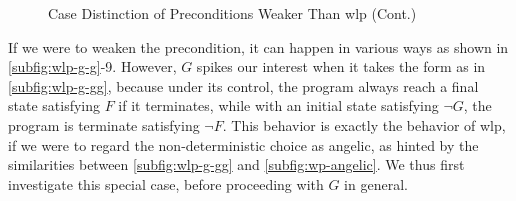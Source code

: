\begin{figure}[ht!]\centering
	\ContinuedFloat
	\hfill

	\hfill
\caption{Case Distinction of Preconditions Weaker Than wlp (Cont.) }
\label{fig:wlp-g-2}
\end{figure}
If we were to weaken the precondition, it can happen in various ways as shown in \autoref{subfig:wlp-g-g}{\color{RoyalBlue}-9}. 
However, $G$ spikes our interest when it takes the form as in \autoref{subfig:wlp-g-gg}, because under its control, the program always  reach a final state satisfying $F$ if it terminates, while with an initial state satisfying $\neg G$, the program is  terminate satisfying $\neg F$. 
This behavior is exactly the behavior of wlp, if we were to regard the non-deterministic choice as angelic, as hinted by the similarities between \autoref{subfig:wlp-g-gg} and \autoref{subfig:wp-angelic}. 
We thus first investigate this special case, before proceeding with $G$ in general. 

